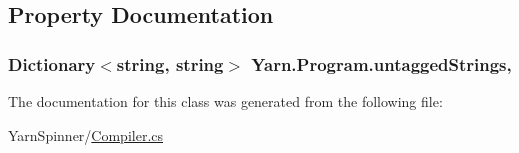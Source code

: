 \subsection{Property Documentation}
\hypertarget{a00126_aa8fedbfceaf931d1da3f600eaab6ae87}{
\subsubsection[{untagged\-Strings}]{\setlength{\rightskip}{0pt plus 5cm}Dictionary$<$string, string$>$ Yarn.\-Program.\-untagged\-Strings\hspace{0.3cm}{\ttfamily [get]}, {\ttfamily [package]}}}\label{a00126_aa8fedbfceaf931d1da3f600eaab6ae87}


The documentation for this class was generated from the following file\-:\begin{DoxyCompactItemize}
\item 
Yarn\-Spinner/\hyperlink{a00264}{Compiler.\-cs}\end{DoxyCompactItemize}
